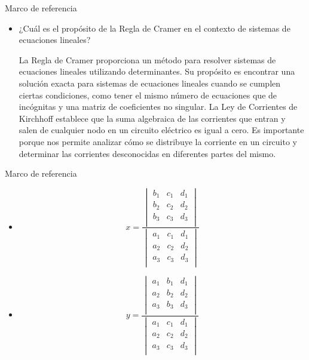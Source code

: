 \documentclass[svgnames, aspectratio=169]{beamer}
\begin{document}
\begin{frame}{Marco de referencia}
\begin{itemize}
    \item ¿Cuál es el propósito de la Regla de Cramer en el contexto de sistemas de ecuaciones lineales?

La Regla de Cramer proporciona un método para resolver sistemas de ecuaciones lineales utilizando determinantes. Su propósito es encontrar una solución exacta para sistemas de ecuaciones lineales cuando se cumplen ciertas condiciones, como tener el mismo número de ecuaciones que de incógnitas y una matriz de coeficientes no singular.
    La Ley de Corrientes de Kirchhoff establece que la suma algebraica de las corrientes que entran y salen de cualquier nodo en un circuito eléctrico es igual a cero. Es importante porque nos permite analizar cómo se distribuye la corriente en un circuito y determinar las corrientes desconocidas en diferentes partes del mismo.
    
\end{itemize}
\end{frame}

    \begin{frame}{Marco de referencia}
\begin{itemize}
        \item \begin{equation}
    x = \frac{
        \begin{vmatrix}
            b_{1} & c_{1} & d_{1} \\
            b_{2} & c_{2} & d_{2} \\
            b_{3} & c_{3} & d_{3} \\
        \end{vmatrix}
    }{
        \begin{vmatrix}
            a_{1} & c_{1} & d_{1} \\
            a_{2} & c_{2} & d_{2} \\
            a_{3} & c_{3} & d_{3} \\
        \end{vmatrix}
    }
\end{equation}

\item   \begin{equation}
    y = \frac{
        \begin{vmatrix}
            a_{1} & b_{1} & d_{1} \\
            a_{2} & b_{2} & d_{2} \\
            a_{3} & b_{3} & d_{3} \\
        \end{vmatrix}
    }{
        \begin{vmatrix}
            a_{1} & c_{1} & d_{1} \\
            a_{2} & c_{2} & d_{2} \\
            a_{3} & c_{3} & d_{3} \\
        \end{vmatrix}
    }
\end{equation}
   
\end{itemize}
\end{frame}
\end{document}
